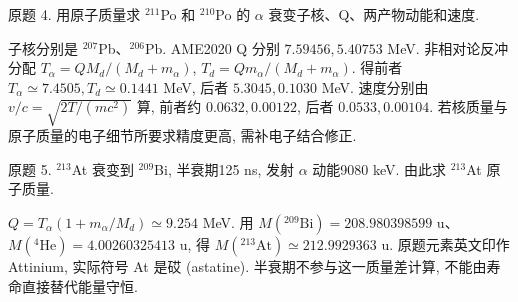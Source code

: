 \begin{exercise}\label{ex:2202-3-4}
原题 4. 用原子质量求 $^{211}$Po 和 $^{210}$Po 的 $\alpha$ 衰变子核、Q、两产物动能和速度.
\end{exercise}
\begin{solution}
子核分别是 $^{207}$Pb、$^{206}$Pb. AME2020 Q 分别 $7.59456,5.40753$ MeV. 非相对论反冲分配 $T_\alpha=QM_d/(M_d+m_\alpha)$, $T_d=Qm_\alpha/(M_d+m_\alpha)$. 得前者 $T_\alpha\simeq7.4505,T_d\simeq0.1441$ MeV, 后者 $5.3045,0.1030$ MeV. 速度分别由 $v/c=\sqrt{2T/(mc^2)}$ 算, 前者约 $0.0632,0.00122$, 后者 $0.0533,0.00104$. 若核质量与原子质量的电子细节所要求精度更高, 需补电子结合修正.
\end{solution}
\begin{exercise}\label{ex:2202-3-5}
原题 5. $^{213}$At 衰变到 $^{209}$Bi, 半衰期125 ns, 发射 $\alpha$ 动能9080 keV. 由此求 $^{213}$At 原子质量.
\end{exercise}
\begin{solution}
$Q=T_\alpha(1+m_\alpha/M_d)\simeq9.254$ MeV. 用 $M({}^{209}\mathrm{Bi})=208.980398599$ u、$M({}^4\mathrm{He})=4.00260325413$ u, 得 $M({}^{213}\mathrm{At})\simeq212.9929363$ u. 原题元素英文印作 Attinium, 实际符号 At 是砹 (astatine). 半衰期不参与这一质量差计算, 不能由寿命直接替代能量守恒.
\end{solution}
